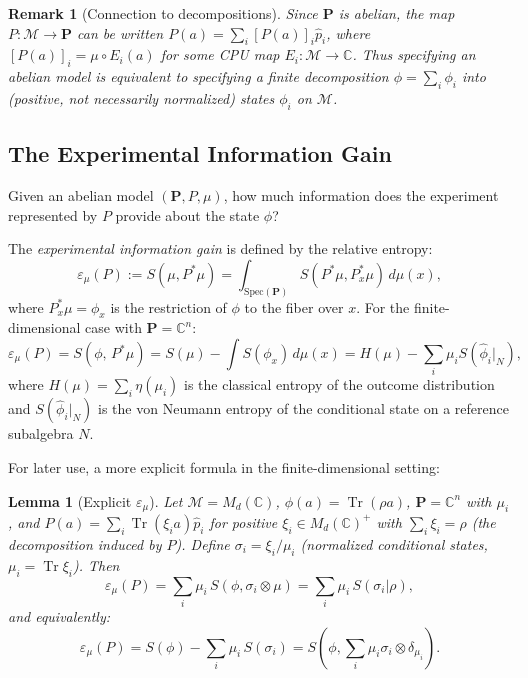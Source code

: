 \documentclass[12pt,a4paper]{article}
\newtheorem{lemma}[theorem]{Lemma}
\newtheorem{remark}[theorem]{Remark}
\newcommand{\CC}{\mathbb{C}}
\newcommand{\Tr}{\operatorname{Tr}}
\newcommand{\Md}{M_d(\CC)}
\newcommand{\vN}{\mathcal{M}}      %
\newcommand{\Srel}{S}              %
\newcommand{\eps}{\varepsilon}
\begin{document}
\begin{remark}[Connection to decompositions]\label{rmk:decomp}
Since $\mathbf{P}$ is abelian, the map $P:\vN\to\mathbf{P}$ can be written
$P(a) = \sum_i [P(a)]_i\hat{p}_i$, where $[P(a)]_i = \mu\circ E_i(a)$ for some
CPU map $E_i:\vN\to\CC$.  Thus specifying an abelian model is equivalent to
specifying a finite decomposition $\phi=\sum_i\phi_i$ into (positive, not necessarily
normalized) states $\phi_i$ on $\vN$.
\end{remark}

\subsection{The Experimental Information Gain}

Given an abelian model $(\mathbf{P},P,\mu)$, how much information does the experiment
represented by $P$ provide about the state $\phi$?

The \emph{experimental information gain} is defined by the relative entropy:
\begin{equation}\label{eq:exp_info_gain}
  \eps_\mu(P) := \Srel(\mu,P^*\mu)
  = \int_{\mathrm{Spec}(\mathbf{P})} \Srel(P^*\mu,P^*_x\mu)\,d\mu(x),
\end{equation}
where $P^*_x\mu = \phi_x$ is the restriction of $\phi$ to the fiber over $x$.
For the finite-dimensional case with $\mathbf{P}=\CC^n$:
\begin{equation}\label{eq:eps_finite}
  \eps_\mu(P) = \Srel(\phi,\,P^*\mu)
  = S(\mu) - \int S(\phi_x)\,d\mu(x)
  = H(\mu) - \sum_i \mu_i S(\hat\phi_i|_N),
\end{equation}
where $H(\mu)=\sum_i\eta(\mu_i)$ is the classical entropy of the outcome distribution
and $S(\hat\phi_i|_N)$ is the von Neumann entropy of the conditional state on a
reference subalgebra $N$.

For later use, a more explicit formula in the finite-dimensional setting:

\begin{lemma}[Explicit $\eps_\mu$]\label{lem:eps_explicit}
Let $\vN=\Md$, $\phi(a)=\Tr(\rho a)$, $\mathbf{P}=\CC^n$ with $\mu_i$,
and $P(a)=\sum_i \Tr(\xi_i a)\hat{p}_i$ for positive $\xi_i\in\Md^+$
with $\sum_i\xi_i=\rho$ (the decomposition induced by $P$).
Define $\sigma_i = \xi_i/\mu_i$ (normalized conditional states, $\mu_i=\Tr\xi_i$).
Then
\begin{equation}\label{eq:eps_formula}
  \eps_\mu(P) = \sum_i \mu_i\,\Srel(\phi,\sigma_i\otimes\mu)
  = \sum_i \mu_i\,S(\sigma_i|\rho),
\end{equation}
and equivalently:
\begin{equation}\label{eq:eps_formula2}
  \eps_\mu(P) = S(\phi) - \sum_i \mu_i\,S(\sigma_i)
  = \Srel\!\left(\phi,\sum_i\mu_i\sigma_i\otimes\delta_{\mu_i}\right).
\end{equation}
\end{lemma}
\end{document}
